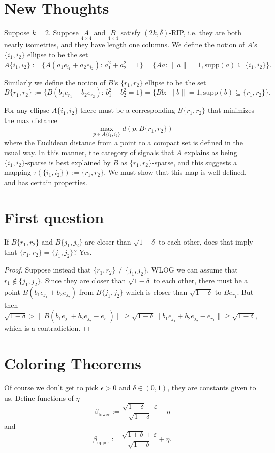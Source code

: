 \documentclass[11pt]{amsart}
\begin{document}
\section{New Thoughts}
Suppose $k=2$.  Suppose  $\underset{4\times 4}{A}$ and $\underset{4\times 4}{B}$ satisfy $(2k,\delta)$-RIP, i.e. they are both
nearly isometries, and they have length one columns.  We define the notion of $A$'s $\{i_1,i_2\}$ ellipse to be the set
\[A\{i_1,i_2\}:=\{A(a_1e_{i_1}+a_2e_{i_2}):\, a_1^2+a_2^2=1\}=\{Aa:\, \|a\|=1, \text{supp}(a)\subseteq \{i_1,i_2\}\}.\]

Similarly we define the notion of $B$'s $\{r_1,r_2\}$ ellipse to be the set
\[B\{r_1,r_2\}:=\{B(b_1e_{r_1}+b_2e_{r_2}):\, b_1^2+b_2^2=1\}=\{Bb:\, \|b\|=1, \text{supp}(b)\subseteq \{r_1,r_2\}\}.\]

For any ellipse $A\{i_1,i_2\}$ there must be a corresponding $B\{r_1,r_2\}$ that minimizes the max distance 
\begin{equation}\underset{p\in A\{i_1,i_2\}}{\max} d(p, B\{r_1,r_2\})\end{equation}
where the Euclidean distance from a point to a compact set is defined in the usual way.
In this manner, the category of signals that $A$ explains as being $\{i_1,i_2\}$-sparse is best explained by 
$B$ as $\{r_1,r_2\}$-sparse, and this suggests a mapping $\tau(\{i_1,i_2\}):=\{r_1,r_2\}$.   We must show that
this map is well-defined, and has certain properties.  
\section{First question} 
If  $B\{r_1,r_2\}$ and $B\{j_1,j_2\}$ are closer than $\sqrt{1-\delta}$  to
each other, does that imply that $\{r_1,r_2\}=\{j_1,j_2\}$?  Yes.
\begin{proof}
Suppose instead that $\{r_1,r_2\}\neq \{j_1,j_2\}$.
WLOG we can assume that $r_1\notin \{j_1,j_2\}$.  Since they are closer than $\sqrt{1-\delta}$ to each other, there 
must be a point $B(b_1e_{j_1}+b_2e_{j_2})$ from $B\{j_1,j_2\}$ which is closer than $\sqrt{1-\delta}$ to $Be_{r_1}$.
But then $\sqrt{1-\delta}> \|B(b_1e_{j_1}+b_2e_{j_2}-e_{r_1})\|\geq \sqrt{1-\delta} \|b_1e_{j_1}+b_2e_{j_2}-e_{r_1}\| \geq \sqrt{1-\delta}$,
which is a contradiction.  
\end{proof}

\section{Coloring Theorems}
Of course we don't get to pick $\epsilon>0$ and $\delta\in (0,1)$, they are constants given to us.  Define functions of $\eta$
\[\beta_\text{lower}:= \frac{\sqrt{1-\delta}-\varepsilon}{\sqrt{1+\delta}} - \eta\] and
\[\beta_\text{upper}:= \frac{\sqrt{1+\delta}+\varepsilon}{\sqrt{1-\delta}} + \eta.\]
\end{document}
